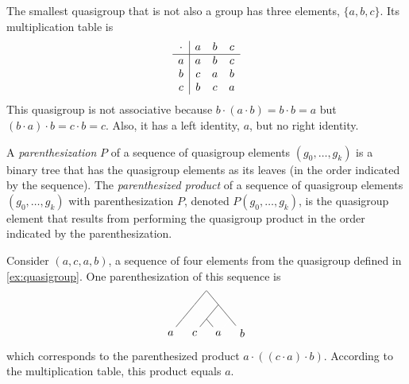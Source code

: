 \documentclass{article}
\begin{document}
\begin{example}\label{ex:quasigroup}
  The smallest quasigroup that is not also a group has three elements, $\{a, b, c\}$.
  Its multiplication table is
  \begin{equation*}
    \begin{array}{c | c c c}
      \cdot & a & b & c \\
      \hline
      a & a & b & c \\
      b & c & a & b \\
      c & b & c & a \\
    \end{array}
  \end{equation*}
  This quasigroup is not associative because $b \cdot (a \cdot b) = b \cdot b = a$ but $(b \cdot a) \cdot b = c \cdot b = c$.
  Also, it has a left identity, $a$, but no right identity.
\end{example}

A \emph{parenthesization} $P$ of a sequence of quasigroup elements $(g_0, \dotsc, g_k)$ is a binary tree that has the quasigroup elements as its leaves (in the order indicated by the sequence).
The \emph{parenthesized product} of a sequence of quasigroup elements $(g_0, \dotsc, g_k)$ with parenthesization $P$, denoted $P(g_0, \dotsc, g_k)$, is the quasigroup element that results from performing the quasigroup product in the order indicated by the parenthesization.

\begin{example}
  Consider $(a, c, a, b)$, a sequence of four elements from the quasigroup defined in \autoref{ex:quasigroup}.
  One parenthesization of this sequence is
  \begin{equation*}
    \begin{tikzpicture}[xscale=0.5, yscale=0.3]
      \node[minimum size=0pt, inner sep=0pt] {}
      child {
        child {
          child {node {$a$}}
          child[color=white] {}
        }
        child[color=white] {}
      }
      child {
        child {
          child {node {$c$}}
          child {node {$a$}}
        }
        child {
          child[color=white] {}
          child {node {$b$}}
        }
      };
    \end{tikzpicture}
  \end{equation*}
  which corresponds to the parenthesized product $a \cdot ((c \cdot a) \cdot b)$.
  According to the multiplication table, this product equals $a$.
\end{example}
\end{document}
